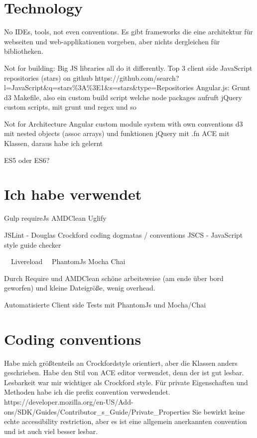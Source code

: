 
\section{Technology}


No IDEs, tools, not even conventions. Es gibt frameworks die eine architektur für webseiten und web-applikationen vorgeben, aber nichts dergleichen für bibliotheken.

Not for building:
Big JS libraries all do it differently.
Top 3 client side JavaScript repositories (stars) on github
https://github.com/search?l=JavaScript\&q=stars\%3A\%3E1\&s=stars\&type=Repositories
Angular.js: Grunt
d3 Makefile, also ein custom build script welche node packages aufruft
jQuery custom scripts, mit grunt und regex und so

Not for Architecture
Angular custom module system with own conventions
d3 mit nested objects (assoc arrays) und funktionen
jQuery mit .fn
ACE mit Klassen, daraus habe ich gelernt

ES5 oder ES6?


\section{Ich habe verwendet}

Gulp
requireJs
AMDClean
Uglify

JSLint - Douglas Crockford coding dogmatas / conventions
JSCS - JavaScript style guide checker

~~Livereload~~
PhantomJs
Mocha
Chai

Durch Require und AMDClean schöne arbeitsweise (am ende über bord geworfen) und kleine Dateigröße, wenig overhead.

Automatisierte Client side Tests mit PhantomJs und Mocha/Chai


\section{Coding conventions}

Habe mich größtenteils an Crockfordstyle orientiert, aber die Klassen anders geschrieben. Habe den Stil von ACE editor verwendet, denn der ist gut lesbar. Lesbarkeit war mir wichtiger als Crockford style. Für private Eigenschaften und Methoden habe ich die prefix convention verwedendet.
https://developer.mozilla.org/en-US/Add-ons/SDK/Guides/Contributor\_s\_Guide/Private\_Properties
Sie bewirkt keine echte accessibility restriction, aber es ist eine allgemein anerkannten convention und ist auch viel besser lesbar.

